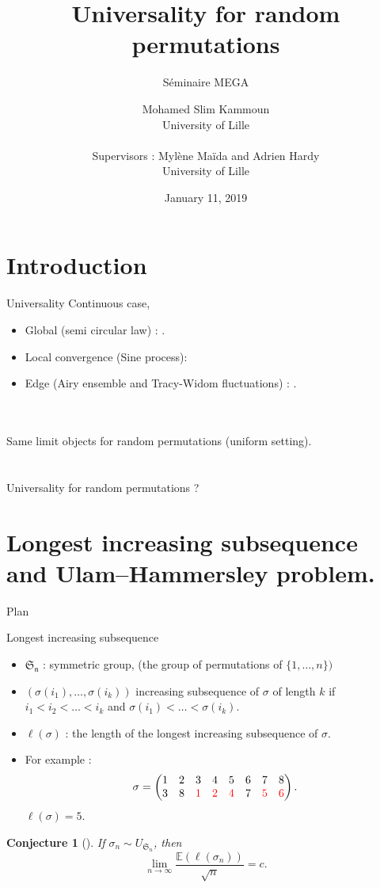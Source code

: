 \documentclass[english]{beamer}
\title{Universality for random permutations}
\subtitle {Séminaire MEGA}
\author 
{ \large{Mohamed Slim Kammoun}
\\ \small{University of Lille} \\ \ \\ \large{Supervisors :  Mylène Maïda  and Adrien Hardy}
\\ \small{University of Lille}
}
\date {  January 11, 2019}
\newtheorem{conjecture}[theorem]{Conjecture}
\begin{document}
\begin{frame}
  \titlepage  
\end{frame}



\section*{Introduction}
\begin{frame}{Universality}
 Continuous case, 
    \begin{itemize}
        \item Global (semi circular law) : 
        \cite{10.2307/1970008,Pastur1972}. 
        \item Local convergence (Sine process): \cite*{MR2411912,Erdos2010}
        \item Edge (Airy ensemble and Tracy-Widom fluctuations) : \cite{tao2011}.
     
    \end{itemize}
    \ \\ 
    \ \\ 
    Same limit objects for random permutations (uniform setting).  
    \\
    \ \\ 
        \ \\ 
Universality for  random permutations ?
\end{frame}


\section{Longest increasing subsequence and Ulam–Hammersley problem.}
\begin{frame}{Plan}
\tableofcontents[currentsection,currentsubsection,
    hideothersubsections, 
    sectionstyle=show/shaded,
]
\end{frame}

\begin{frame}{Longest increasing subsequence}
\begin{itemize}

\item $\mathfrak{S_n}$ : symmetric group, (the  group of permutations of $\{1,\dots,n\})$
\\ 
\item $(\sigma(i_1),\dots,\sigma(i_k))$  increasing  subsequence of $\sigma$ of length $k$ if $i_1<i_2<\dots<i_k$ and $\sigma(i_1)<\dots<\sigma(i_k)$.
\item $\ell(\sigma)$ : the length of the longest increasing subsequence of $\sigma$.
\item For example : $$\sigma = \begin{pmatrix} 
1 & 2 & 3 & 4 & 5 & 6 & 7 & 8 \\
3 & 8 & \color{red} 1 &\color{red} 2 &\color{red} 4 & 7 &\color{red} 5 &\color{red} 6
  \end{pmatrix}.$$
$\ell(\sigma)=5$.
\end{itemize}
    \begin{conjecture}[\cite{ulam}]
    If $\sigma_n \sim {U}_{\mathfrak{S}_n}$, then
    $$\lim_{n\to \infty}\frac{\mathbb{E}(\ell(\sigma_n))}{\sqrt{n}}=c.$$ 
    \end{conjecture}
\end{frame}
\end{document}
